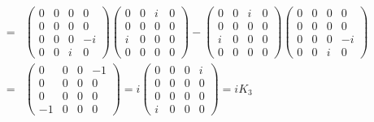 \documentclass[11pt]{article}
\begin{document}
\begin{eqnarray}
    [J_1,K_2]&=&
    \begin{pmatrix}
        0 & 0 & 0 & 0\\
        0 & 0 & 0 & 0 \\
        0 & 0 & 0 & -i \\
        0 & 0 & i & 0
    \end{pmatrix}
    \begin{pmatrix}
        0 & 0 & i & 0\\ 
        0 & 0 & 0 & 0 \\
        i & 0 & 0 & 0 \\
        0 & 0 & 0 & 0
    \end{pmatrix}
    -
    \begin{pmatrix}
        0 & 0 & i & 0\\ 
        0 & 0 & 0 & 0 \\
        i & 0 & 0 & 0 \\
        0 & 0 & 0 & 0
    \end{pmatrix}
    \begin{pmatrix}
        0 & 0 & 0 & 0\\
        0 & 0 & 0 & 0 \\
        0 & 0 & 0 & -i \\
        0 & 0 & i & 0
    \end{pmatrix} \\ 
    &=&
    \begin{pmatrix}
        0 & 0 & 0 & -1 \\
        0 & 0 & 0 & 0 \\
        0 & 0 & 0 & 0 \\
        -1 & 0 & 0 & 0 
    \end{pmatrix}
    =i
    \begin{pmatrix}
        0 & 0 & 0 & i \\
        0 & 0 & 0 & 0 \\
        0 & 0 & 0 & 0 \\
        i & 0 & 0 & 0 
    \end{pmatrix}
    =iK_3
\end{eqnarray}
\end{document}
